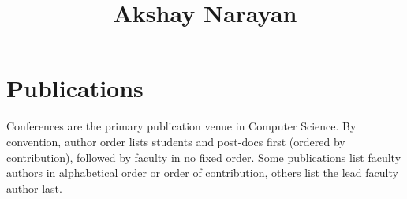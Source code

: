 \documentclass{article}
\newcommand{\preDoc}{}
\newcommand{\titleAndEmptyVersionAndEmptyAuthors}[3]{\title{#1}\maketitle}
\newcommand{\identity}[1]{#1}
\begin{document}
\preDoc
\date{}
\titleAndEmptyVersionAndEmptyAuthors{Akshay Narayan}{}{}
\label{t:x28part_x22Akshayx5fNarayanx22x29}



\identity{\section{Publications}}

\identity{
\smallskip
\begin{adjustwidth}{1cm}{}
{\footnotesize
Conferences are the primary publication venue in Computer Science.
By convention, author order lists students and post-docs first (ordered by contribution), followed by faculty in no fixed order. Some publications list faculty authors in alphabetical order or order of contribution, others list the lead faculty author last.
}
\end{adjustwidth}
}
\end{document}
